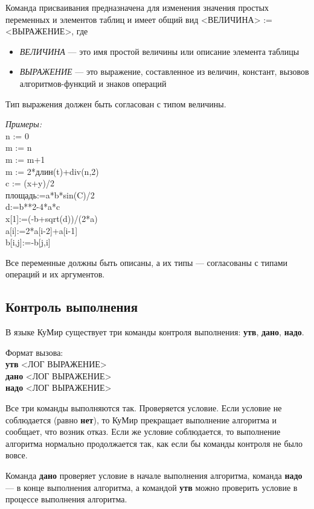 Команда присваивания предназначена для изменения значения простых переменных и элементов таблиц и имеет общий вид \textsf{<ВЕЛИЧИНА> := <ВЫРАЖЕНИЕ>}, где
\begin{itemize}
\item \emph{ВЕЛИЧИНА} --- это имя простой величины или описание элемента таблицы
\item \emph{ВЫРАЖЕНИЕ} --- это выражение, составленное из величин, констант, вызовов ал\-го\-рит\-мов-функ\-ций и знаков операций
\end{itemize}

Тип выражения должен быть согласован с типом величины.

\emph{Примеры:}\\
{\sffamily
n := 0\\
m := n\\
m := m+1\\
m := 2*длин(t)+div(n,2)\\
c := (x+y)/2\\
площадь:=a*b*sin(C)/2\\
d:=b**2-4*a*c\\
x[1]:=(-b+sqrt(d))/(2*a)\\
a[i]:=2*a[i-2]+a[i-1]\\
b[i,j]:=-b[j,i]
}

Все переменные должны быть описаны, а их типы --- согласованы с типами операций и их аргументов.

\subsection{Контроль выполнения}

В языке КуМир существует три команды контроля выполнения: \textbf{утв}, \textbf{дано}, \textbf{надо}.

	Формат вызова:\\
{\sffamily
\textbf{утв} <ЛОГ ВЫРАЖЕНИЕ>\\
\textbf{дано} <ЛОГ ВЫРАЖЕНИЕ>\\
\textbf{надо} <ЛОГ ВЫРАЖЕНИЕ>
}
	
	Все три команды выполняются так. Проверяется условие. Если условие не соблюдается (равно \textbf{нет}), то КуМир прекращает выполнение алгоритма и сообщает, что возник отказ. Если же условие соблюдается, то выполнение алгоритма нормально продолжается так, как если бы команды контроля не было вовсе.

	Команда \textbf{дано} проверяет условие в начале выполнения алгоритма, команда \textbf{надо} --- в конце выполнения алгоритма, а командой \textbf{утв} можно проверить условие в процессе выполнения алгоритма.
	
